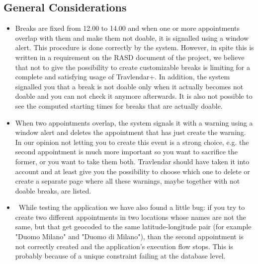 \subsection{General Considerations}
\begin{itemize}
	\item Breaks are fixed from 12.00 to 14.00 and when one or more appointments overlap with them and make them not doable, it is signalled using a window alert. This procedure is done correctly by the system. However, in spite this is written in a requirement on the RASD document of the project, we believe that not to give the possibility to create customizable breaks is limiting for a complete and satisfying usage of Travlendar+. In addition, the system signalled you that a break is not doable only when it actually becomes not doable and you can not check it anymore afterwards. It is also not possible to see the computed starting times for breaks that are actually doable.
	\item When two appointments overlap, the system signals it with a warning using a window alert and deletes the appointment that has just create the warning. In our opinion not letting you to create this event is a strong choice, e.g. the second appointment is much more important so you want to sacrifice the former, or you want to take them both. Travlendar should have taken it into account and at least give you the possibility to choose which one to delete or create a separate page where all these warnings, maybe together with not doable breaks, are listed.
	\item~While testing the application we have also found a little bug: if you try to create two different appointments in two locations whose names are not the same, but that get geocoded to the same latitude-longitude pair (for example "Duomo Milano" and "Duomo di Milano"), than the second appointment is not correctly created and the application's execution flow stops. This is probably because of a unique constraint failing at the database level.
\end{itemize}